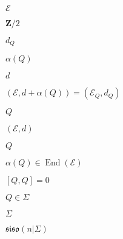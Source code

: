 \begin{preview}
\setcounter{equation}{0}%
\( \mathcal{E} \)
\end{preview}

\begin{preview}
\setcounter{equation}{0}%
\( \mathbf{Z}/2 \)
\end{preview}

\begin{preview}
\setcounter{equation}{0}%
\( d_Q \)
\end{preview}

\begin{preview}
\setcounter{equation}{0}%
\( \alpha(Q) \)
\end{preview}

\begin{preview}
\setcounter{equation}{0}%
\( d \)
\end{preview}

\begin{preview}
\setcounter{equation}{0}%
\(( \mathcal{E},d + \alpha(Q) ) = (\mathcal{E}_Q , d_Q) \)
\end{preview}

\begin{preview}
\setcounter{equation}{0}%
\( Q \)
\end{preview}

\begin{preview}
\setcounter{equation}{0}%
\( ( \mathcal{E},d) \)
\end{preview}

\begin{preview}
\setcounter{equation}{0}%
\( Q \)
\end{preview}

\begin{preview}
\setcounter{equation}{0}%
\( \alpha(Q)\in \operatorname{End}( \mathcal{E}) \)
\end{preview}

\begin{preview}
\setcounter{equation}{0}%
\( \left[ Q,Q \right]=0 \)
\end{preview}

\begin{preview}
\setcounter{equation}{0}%
\( Q \in \Sigma \)
\end{preview}

\begin{preview}
\setcounter{equation}{0}%
\( \Sigma \)
\end{preview}

\begin{preview}
\setcounter{equation}{0}%
\( \mathfrak{siso}(n  | \Sigma) \)
\end{preview}

